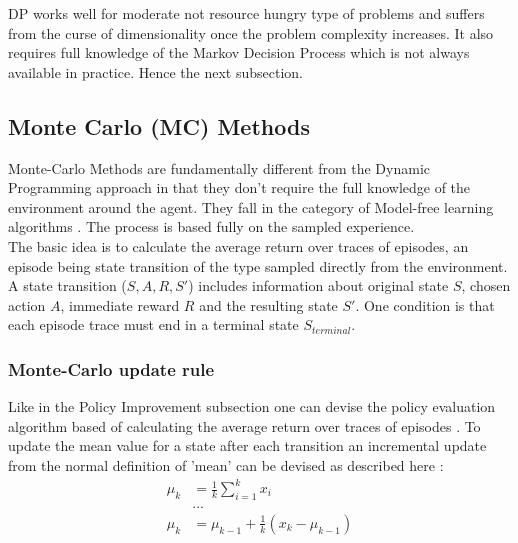 DP works well for moderate not resource hungry type of problems and suffers from the curse of dimensionality once the problem complexity increases. It also requires full knowledge of the Markov Decision Process which is not always available in practice. Hence the next subsection. 

\subsection{Monte Carlo (MC) Methods}

Monte-Carlo Methods are fundamentally different from the 
Dynamic Programming approach in that they don't require the 
full knowledge of the environment around the agent. They fall
in the category of Model-free learning algorithms \cite{lecture_mfl}. The process is based fully on the sampled experience.  \\

The basic idea is to calculate the average return over traces of episodes, an episode being state transition of the type sampled directly from the environment. A state transition ($S, A, R, S'$) includes information about original state $S$, chosen action $A$, immediate reward $R$ and the resulting state $S'$. One condition is that each episode trace must end in a terminal state $S_{terminal}$. 

\subsubsection{Monte-Carlo update rule}

Like in the Policy Improvement subsection one can devise the policy evaluation algorithm based of calculating the average return over traces of episodes \cite{lecture_mfl}. 
To update the mean value for a state after each transition an incremental update from the normal definition of 'mean' can be devised as described here \cite{lecture_mfl} :
\begin{align}
    \mu_k &= \frac{1}{k}\sum^{k}_{i = 1} x_i \nonumber \\
    &... \nonumber \\
    \mu_k &= \mu_{k - 1} + \frac{1}{k} (x_k - \mu_{k - 1})
\end{align}

